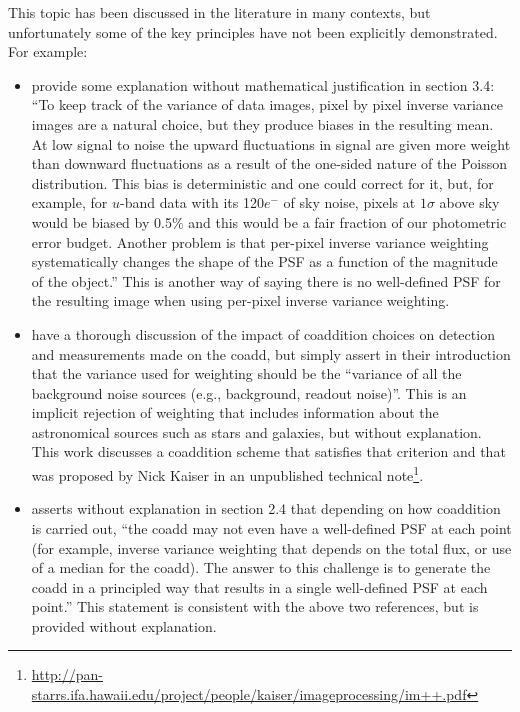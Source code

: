 \documentclass{aastex63}
\begin{document}
This topic has been discussed in the literature in many contexts, but unfortunately some of the key principles have not been explicitly demonstrated.  For example:
\begin{itemize}
\item \citet{2014ApJ...794..120A} provide some explanation without mathematical justification in section 3.4: ``To keep track of the variance of data images, pixel by
pixel inverse variance images are a natural choice, but
they produce biases in the resulting mean. At low signal to noise the upward fluctuations in signal are given
more weight than downward fluctuations as a result of
the one-sided nature of the Poisson distribution. This
bias is deterministic and one could correct for it, but,
for example, for $u$-band data with its 120$e^{-}$ of sky noise,
pixels at $1\sigma$ above sky would be biased by 0.5\% and this
would be a fair fraction of our photometric error budget. Another problem is that per-pixel inverse variance
weighting systematically changes the shape of the PSF
as a function of the magnitude of the object.''  This is another way of saying there is no well-defined PSF for the resulting image when using per-pixel inverse variance weighting.

\item \citet{2017ApJ...836..187Z} have a thorough discussion of the impact of coaddition choices on detection and measurements made on the coadd, but simply assert in their introduction that the variance used for weighting should be the ``variance of all the background noise sources (e.g., background, readout noise)''.  This is an implicit rejection of weighting that includes information about the astronomical sources such as stars and galaxies, but without explanation. This work discusses a coaddition scheme that satisfies that criterion and that was proposed by Nick Kaiser in an unpublished technical note\footnote{\url{http://pan-starrs.ifa.hawaii.edu/project/people/kaiser/imageprocessing/im++.pdf}}.

    \item \citet{2018ARA&A..56..393M} asserts without explanation in section 2.4 that depending on how coaddition is carried out, ``the coadd may not even have a well-defined PSF at each point (for example, inverse
variance weighting that depends on the total flux, or use of a median for the coadd). The
answer to this challenge is to generate the coadd in a principled way that results in a single
well-defined PSF at each point.'' This statement is consistent with the above two references, but is provided without explanation.


\end{itemize}
\end{document}
